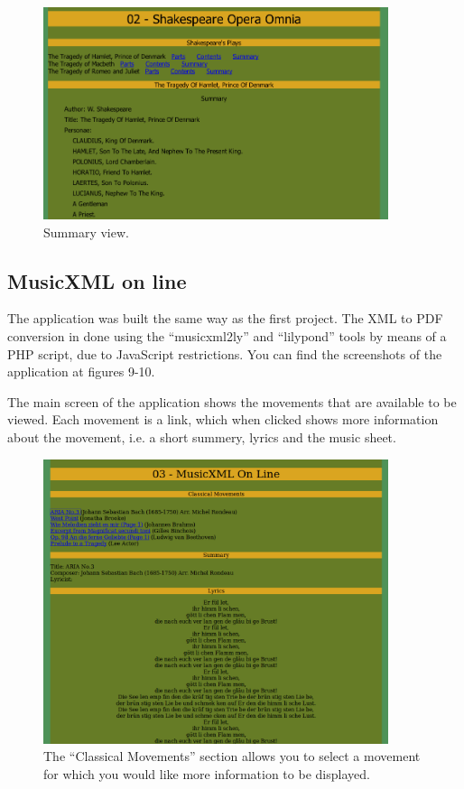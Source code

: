 \documentclass[a4paper, notitlepage]{article}
\begin{document}
\begin{figure}[ht]
\begin{center}
\includegraphics[width=0.9\textwidth]{02-5.png}
\caption{Summary view.}
\label{fig:02-5}
\end{center}
\end{figure}

\clearpage
\subsection{MusicXML on line}

The application was built the same way as the first project. The XML to PDF conversion in done using the ``musicxml2ly'' and ``lilypond'' tools by means of a PHP script, due to JavaScript restrictions. You can find the screenshots of the application at figures 9-10.

The main screen of the application shows the movements that are available to be viewed. Each movement is a link, which when clicked shows more information about the movement, i.e. a short summery, lyrics and the music sheet.

\begin{figure}[ht]
\begin{center}
\includegraphics[width=0.9\textwidth]{03-1.png}
\caption{The ``Classical Movements'' section allows you to select a movement for which you would like more information to be displayed.}
\label{fig:03-1}
\end{center}
\end{figure}
\end{document}
